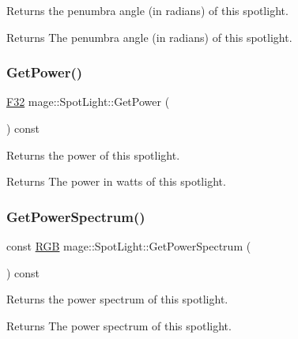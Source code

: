 Returns the penumbra angle (in radians) of this spotlight.

\begin{DoxyReturn}{Returns}
The penumbra angle (in radians) of this spotlight. 
\end{DoxyReturn}
\hypertarget{classmage_1_1_spot_light_afcfb600550f5ca9292e79e5bedb9fad7}{}\label{classmage_1_1_spot_light_afcfb600550f5ca9292e79e5bedb9fad7} 
\subsubsection{\texorpdfstring{Get\+Power()}{GetPower()}}
{\footnotesize\ttfamily \hyperlink{namespacemage_aa97e833b45f06d60a0a9c4fc22ae02c0}{F32} mage\+::\+Spot\+Light\+::\+Get\+Power (\begin{DoxyParamCaption}{ }\end{DoxyParamCaption}) const\hspace{0.3cm}{\ttfamily [noexcept]}}

Returns the power of this spotlight.

\begin{DoxyReturn}{Returns}
The power in watts of this spotlight. 
\end{DoxyReturn}
\hypertarget{classmage_1_1_spot_light_a2c9926f4332198ef4183f7958e9a5644}{}\label{classmage_1_1_spot_light_a2c9926f4332198ef4183f7958e9a5644} 
\subsubsection{\texorpdfstring{Get\+Power\+Spectrum()}{GetPowerSpectrum()}}
{\footnotesize\ttfamily const \hyperlink{structmage_1_1_r_g_b}{R\+GB} mage\+::\+Spot\+Light\+::\+Get\+Power\+Spectrum (\begin{DoxyParamCaption}{ }\end{DoxyParamCaption}) const\hspace{0.3cm}{\ttfamily [noexcept]}}

Returns the power spectrum of this spotlight.

\begin{DoxyReturn}{Returns}
The power spectrum of this spotlight. 
\end{DoxyReturn}
\hypertarget{classmage_1_1_spot_light_a19baba95ca8c5f5f6147ab0a03e6b64a}{}\label{classmage_1_1_spot_light_a19baba95ca8c5f5f6147ab0a03e6b64a} 
